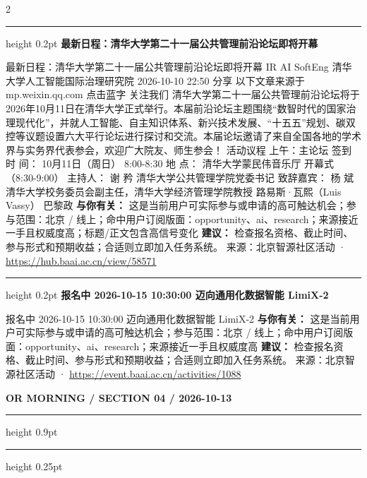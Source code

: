 \documentclass[10.5pt]{ctexart}
\begin{document}
\begin{multicols}{2}
\vspace{2mm}
\hrule height 0.2pt
\vspace{2mm}
{\large\bfseries 最新日程：清华大学第二十一届公共管理前沿论坛即将开幕}\par
最新日程：清华大学第二十一届公共管理前沿论坛即将开幕 IR AI SoftEng 清华大学人工智能国际治理研究院 2026-10-10 22:50 分享 以下文章来源于mp.weixin.qq.com 点击蓝字 关注我们 清华大学第二十一届公共管理前沿论坛将于2026年10月11日在清华大学正式举行。本届前沿论坛主题围绕“数智时代的国家治理现代化”，并就人工智能、自主知识体系、新兴技术发展、“十五五”规划、碳双控等议题设置六大平行论坛进行探讨和交流。本届论坛邀请了来自全国各地的学术界与实务界代表参会，欢迎广大院友、师生参会！ 活动议程 上午：主论坛 签到 时 间： 10月11日（周日） 8:00-8:30 地 点： 清华大学蒙民伟音乐厅 开幕式（8:30-9:00） 主持人： 谢 矜 清华大学公共管理学院党委书记 致辞嘉宾： 杨 斌 清华大学校务委员会副主任，清华大学经济管理学院教授 路易斯·瓦熙（Luis Vassy） 巴黎政
\textbf{与你有关：} 这是当前用户可实际参与或申请的高可触达机会；参与范围：北京 / 线上；命中用户订阅版面：opportunity、ai、research；来源接近一手且权威度高；标题/正文包含高信号变化
\textbf{建议：} 检查报名资格、截止时间、参与形式和预期收益；合适则立即加入任务系统。
{\footnotesize\color{ormuted} 来源：北京智源社区活动 · \url{https://hub.baai.ac.cn/view/58571}}
\vspace{2mm}
\hrule height 0.2pt
\vspace{2mm}
{\large\bfseries 报名中 2026-10-15 10:30:00 迈向通用化数据智能 LimiX-2}\par
报名中 2026-10-15 10:30:00 迈向通用化数据智能 LimiX-2
\textbf{与你有关：} 这是当前用户可实际参与或申请的高可触达机会；参与范围：北京 / 线上；命中用户订阅版面：opportunity、ai、research；来源接近一手且权威度高
\textbf{建议：} 检查报名资格、截止时间、参与形式和预期收益；合适则立即加入任务系统。
{\footnotesize\color{ormuted} 来源：北京智源社区活动 · \url{https://event.baai.ac.cn/activities/1088}}
\end{multicols}
\newpage
{\small\bfseries OR MORNING / SECTION 04 / 2026-10-13}
\vspace{2mm}
\hrule height 0.9pt
\vspace{1.5mm}
\hrule height 0.25pt
\vspace{4mm}
\end{document}
